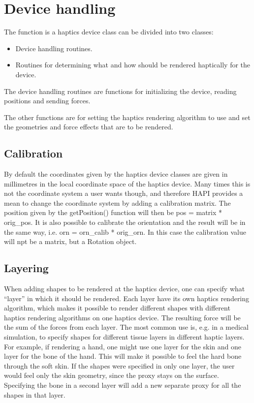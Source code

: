 
\chapter {Device handling}

The function is a haptics device class can be divided into two classes:

\begin{itemize}
\item Device handling routines.
\item Routines for determining what and how should be rendered haptically
for the device. 
\end{itemize}

The device handling routines are functions for initializing the
device, reading positions and sending forces. 

The other functions are for setting the haptics rendering algorithm
to use and set the geometries and force effects that are to be
rendered.

\section{Calibration}
By default the coordinates given by the haptics device classes are
given in millimetres in the local coordinate space of the haptics
device. Many times this is not the coordinate system a user wants
though, and therefore HAPI provides a mean to change the coordinate
system by adding a calibration matrix. The position given by the
getPosition() function will then be pos = matrix * orig_pos. It is
also possible to calibrate the orientation and the result will be in
the same way, i.e. orn = orn_calib * orig_orn. In this case the
calibration value will npt be a matrix, but a Rotation object.

\section{Layering}
When adding shapes to be rendered at the haptics device, one can
specify what ``layer'' in which it should be rendered. Each layer have
its own haptics rendering algorithm, which makes it possible to render
different shapes with different haptics rendering algorithms on one
haptics device. The resulting force will be the sum of the forces from
each layer. The most common use is, e.g. in a medical simulation, to
specify shapes for different tissue layers in different haptic
layers. For example, if rendering a hand, one might use one layer for
the skin and one layer for the bone of the hand. This will make it
possible to feel the hard bone through the soft skin. If the shapes
were specified in only one layer, the user would feel only the skin
geometry, since the proxy stays on the surface. Specifying the bone in
a second layer will add a new separate proxy for all the shapes in
that layer. 

